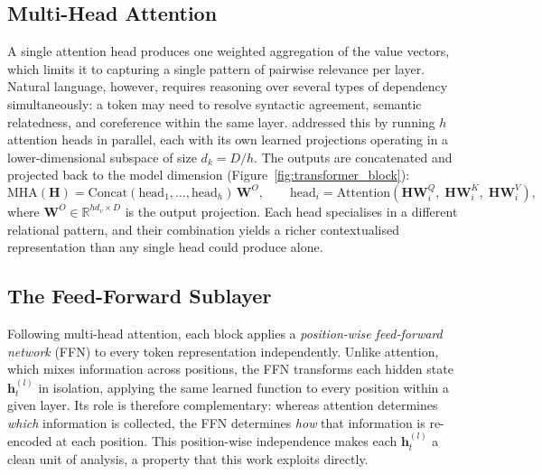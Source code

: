 \subsection{Multi-Head Attention}
\label{subsec:mha}

A single attention head produces one weighted aggregation of the value vectors, which
limits it to capturing a single pattern of pairwise relevance per layer. Natural
language, however, requires reasoning over several types of dependency simultaneously:
a token may need to resolve syntactic agreement, semantic relatedness, and coreference
within the same layer. \citet{vaswani2017attention} addressed this by running $h$
attention heads in parallel, each with its own learned projections operating in a
lower-dimensional subspace of size $d_k = D/h$. The outputs are concatenated and
projected back to the model dimension (Figure~\ref{fig:transformer_block}):
\begin{equation}
    \text{MHA}(\mathbf{H}) =
    \text{Concat}(\text{head}_1, \ldots, \text{head}_h)\,\mathbf{W}^O,
    \qquad
    \text{head}_i = \text{Attention}\!\left(
        \mathbf{H}\mathbf{W}^Q_i,\;
        \mathbf{H}\mathbf{W}^K_i,\;
        \mathbf{H}\mathbf{W}^V_i
    \right),
    \label{eq:mha}
\end{equation}
where $\mathbf{W}^O \in \mathbb{R}^{h d_v \times D}$ is the output projection. Each
head specialises in a different relational pattern, and their combination yields a
richer contextualised representation than any single head could produce alone.%
\subsection{The Feed-Forward Sublayer}
\label{subsec:ffn}

Following multi-head attention, each block applies a \emph{position-wise
feed-forward network} (FFN) to every token representation independently. Unlike
attention, which mixes information across positions, the FFN transforms each hidden
state $\mathbf{h}_t^{(l)}$ in isolation, applying the same learned function to every
position within a given layer. Its role is therefore complementary: whereas attention
determines \emph{which} information is collected, the FFN determines \emph{how} that
information is re-encoded at each position. This position-wise independence makes
each $\mathbf{h}_t^{(l)}$ a clean unit of analysis, a property that this work
exploits directly.

